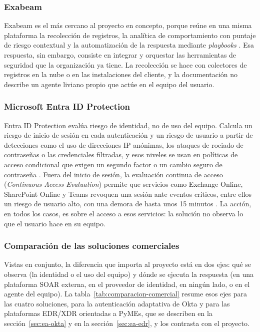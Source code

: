 \subsubsection{Exabeam}\label{sec:ea-exabeam}
Exabeam es el más cercano al proyecto en concepto, porque reúne en una misma plataforma la recolección de registros, la analítica de comportamiento con puntaje de riesgo contextual y la automatización de la respuesta mediante \emph{playbooks} \parencite{ExabeamDocs}. Esa respuesta, sin embargo, consiste en integrar y orquestar las herramientas de seguridad que la organización ya tiene. La recolección se hace con colectores de registros en la nube o en las instalaciones del cliente, y la documentación no describe un agente liviano propio que actúe en el equipo del usuario.

\subsubsection{Microsoft Entra ID Protection}
\label{sec:estado-arte-entra}
Entra ID Protection evalúa riesgo de identidad, no de uso del equipo. Calcula un riesgo de inicio de sesión en cada autenticación y un riesgo de usuario a partir de detecciones como el uso de direcciones IP anónimas, los ataques de rociado de contraseñas o las credenciales filtradas, y esos niveles se usan en políticas de acceso condicional que exigen un segundo factor o un cambio seguro de contraseña \parencite{MicrosoftEntraIDProtection}. Fuera del inicio de sesión, la evaluación continua de acceso (\emph{Continuous Access Evaluation}) permite que servicios como Exchange Online, SharePoint Online y Teams revoquen una sesión ante eventos críticos, entre ellos un riesgo de usuario alto, con una demora de hasta unos 15 minutos \parencite{MicrosoftCAE}. La acción, en todos los casos, es sobre el acceso a esos servicios: la solución no observa lo que el usuario hace en su equipo.

\subsubsection{Comparación de las soluciones comerciales}\label{sec:comparacion-general}
Vistas en conjunto, la diferencia que importa al proyecto está en dos ejes: qué se observa (la identidad o el uso del equipo) y dónde se ejecuta la respuesta (en una plataforma SOAR externa, en el proveedor de identidad, en ningún lado, o en el agente del equipo). La tabla~\ref{tab:comparacion-comercial} resume esos ejes para las cuatro soluciones, para la autenticación adaptativa de Okta y para las plataformas EDR/XDR orientadas a PyMEs, que se describen en la sección~\ref{sec:ea-okta} y en la sección~\ref{sec:ea-edr}, y los contrasta con el proyecto.

